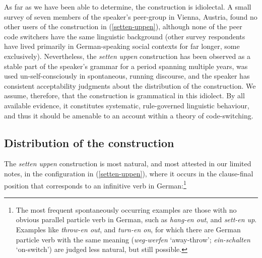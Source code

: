 \documentclass[output=paper]{langscibook}
\begin{document}
As far as we have been able to determine, the construction is idiolectal. A small survey of seven members of the speaker's peer-group in Vienna, Austria, found no other users of the construction in (\ref{setten-uppen}), although none of the peer code switchers have the same linguistic background (other survey respondents have lived primarily in German-speaking social contexts for far longer, some exclusively). Nevertheless, the \textit{setten uppen} construction has been observed as a stable part of the speaker's grammar for a period spanning multiple years, was used un-self-consciously in spontaneous, running discourse, and the speaker has consistent acceptability judgments about the distribution of the construction. We assume, therefore, that the construction is grammatical in this idiolect. By all available evidence, it constitutes systematic, rule-governed linguistic behaviour, and thus it should be amenable to an account within a theory of code-switching. 

\subsection{Distribution of the construction}

The \textit{setten uppen} construction is most natural, and most attested in our limited notes, in the configuration in (\ref{setten-uppen}), where it occurs in the clause-final position that corresponds to an infinitive verb in German:\footnote{The most frequent spontaneously occurring examples are those with no obvious parallel particle verb in German, such as \textit{hang-en out}, and \textit{sett-en up}. Examples like \textit{throw-en out}, and \textit{turn-en on}, for which there are German particle verb with the same meaning (\textit{weg-werfen} `away-throw'; \textit{ein-schalten} `on-switch') are judged less natural, but still possible.}

\ea\label{setten-uppen-2}
\z
\z 
\end{document}
